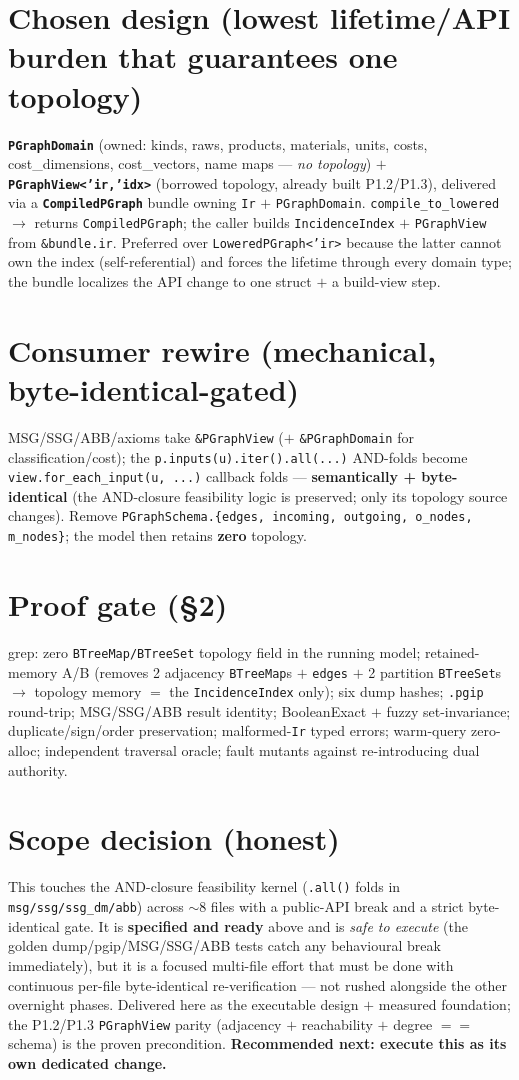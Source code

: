 \documentclass[11pt]{article}\usepackage[margin=1in]{geometry}\usepackage{hyperref}\usepackage{longtable}
\begin{document}
\section*{Chosen design (lowest lifetime/API burden that guarantees one topology)}
\textbf{\texttt{PGraphDomain}} (owned: kinds, raws, products, materials, units, costs, cost\_dimensions,
cost\_vectors, name maps --- \emph{no topology}) $+$ \textbf{\texttt{PGraphView<'ir,'idx>}} (borrowed topology,
already built P1.2/P1.3), delivered via a \textbf{\texttt{CompiledPGraph}} bundle owning \texttt{Ir} $+$
\texttt{PGraphDomain}. \texttt{compile\_to\_lowered} $\to$ returns \texttt{CompiledPGraph}; the caller builds
\texttt{IncidenceIndex} $+$ \texttt{PGraphView} from \texttt{\&bundle.ir}. Preferred over
\texttt{LoweredPGraph<'ir>} because the latter cannot own the index (self-referential) and forces the lifetime
through every domain type; the bundle localizes the API change to one struct $+$ a build-view step.
\section*{Consumer rewire (mechanical, byte-identical-gated)}
MSG/SSG/ABB/axioms take \texttt{\&PGraphView} ($+$ \texttt{\&PGraphDomain} for classification/cost); the
\texttt{p.inputs(u).iter().all(...)} AND-folds become \texttt{view.for\_each\_input(u, ...)} callback folds ---
\textbf{semantically + byte-identical} (the AND-closure feasibility logic is preserved; only its topology source
changes). Remove \texttt{PGraphSchema.\{edges, incoming, outgoing, o\_nodes, m\_nodes\}}; the model then retains
\textbf{zero} topology.
\section*{Proof gate (§2)}
grep: zero \texttt{BTreeMap/BTreeSet} topology field in the running model; retained-memory A/B (removes 2
adjacency \texttt{BTreeMap}s $+$ \texttt{edges} $+$ 2 partition \texttt{BTreeSet}s $\to$ topology memory $=$ the
\texttt{IncidenceIndex} only); six dump hashes; \texttt{.pgip} round-trip; MSG/SSG/ABB result identity;
BooleanExact $+$ fuzzy set-invariance; duplicate/sign/order preservation; malformed-\texttt{Ir} typed errors;
warm-query zero-alloc; independent traversal oracle; fault mutants against re-introducing dual authority.
\section*{Scope decision (honest)}
This touches the AND-closure feasibility kernel (\texttt{.all()} folds in \texttt{msg/ssg/ssg\_dm/abb}) across
$\sim$8 files with a public-API break and a strict byte-identical gate. It is \textbf{specified and ready} above
and is \emph{safe to execute} (the golden dump/pgip/MSG/SSG/ABB tests catch any behavioural break immediately),
but it is a focused multi-file effort that must be done with continuous per-file byte-identical re-verification
--- not rushed alongside the other overnight phases. Delivered here as the executable design $+$ measured
foundation; the P1.2/P1.3 \texttt{PGraphView} parity (adjacency $+$ reachability $+$ degree $==$ schema) is the
proven precondition. \textbf{Recommended next: execute this as its own dedicated change.}
\end{document}
